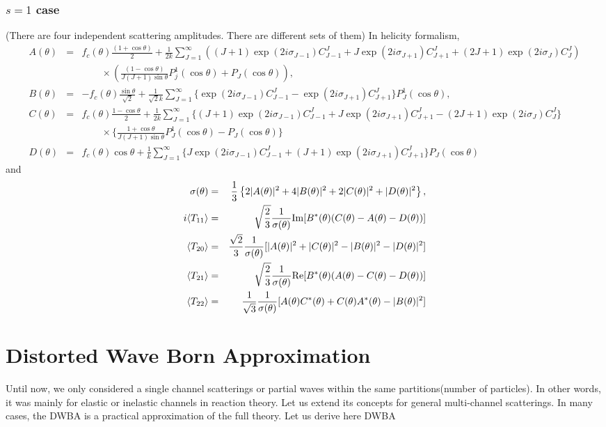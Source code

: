 \documentclass[10pt]{book}
\newcommand{\bea}{\begin{eqnarray}}
\newcommand{\eea}{\end{eqnarray}}
\newcommand{\no}{\nonumber \\}
\def\la{\langle}
\def\ra{\rangle}
\begin{document}
\subsection{$s=1$ case} 
(There are four independent scattering amplitudes. There are different sets of them)
In helicity formalism,
\bea 
A(\theta)&=&f_c(\theta)\frac{ (1+\cos\theta)}{2}
   +\frac{1}{2k}\sum_{J=1}^\infty \left( 
   (J+1) \exp(2i\sigma_{J-1})C_{J-1}^J + J\exp(2i\sigma_{J+1})C_{J+1}^J
   +(2J+1) \exp(2i\sigma_{J})C_{J}^J\right) 
   \no & &\quad \quad \times 
   \left( \frac{(1-\cos\theta)}{J(J+1)\sin\theta } P_j^1(\cos\theta)
   +P_J(\cos\theta)
   \right) ,\no 
B(\theta)&=& -f_c(\theta)\frac{\sin\theta}{\sqrt{2}}+\frac{1}{\sqrt{2}k} \sum_{J=1}^\infty 
    \Big\{ \exp(2i\sigma_{J-1})C^J_{J-1}-    \exp(2i\sigma_{J+1})C^J_{J+1}\Big\} P_J^1(\cos\theta),
    \no 
C(\theta)&=& f_c(\theta)\frac{1-\cos\theta}{2}+\frac{1}{2k}\sum_{J=1}^\infty 
    \Big\{ (J+1)\exp(2i\sigma_{J-1})C^J_{J-1}+    J\exp(2i\sigma_{J+1})C^J_{J+1}
      -(2J+1)\exp(2i\sigma_J)C_J^J\Big\}\no 
      & &\quad \quad \times 
    \Big\{ \frac{1+\cos\theta}{J(J+1)\sin\theta}P_J^1(\cos\theta) -P_J(\cos\theta)  \Big\} 
    \no 
D(\theta) &=& f_c(\theta)\cos\theta +\frac{1}{k}\sum_{J=1}^\infty 
    \Big\{ J\exp(2i\sigma_{J-1}) C_{J-1}^J+(J+1)\exp(2i\sigma_{J+1})C_{J+1}^J\Big\}
    P_J(\cos\theta)       
\eea 
and
\bea 
\sigma(\theta)&=&\frac{1}{3}\left\{2|A(\theta)|^2 +4 |B(\theta)|^2 
         +2 |C(\theta)|^2 +|D(\theta)|^2 \right\},\no 
i\la T_{11}\ra &=& \sqrt{\frac{2}{3}} \frac{1}{\sigma(\theta)}
           {\rm Im} [B^*(\theta)(C(\theta)-A(\theta)-D(\theta))] \no 
\la T_{20}\ra &=& \frac{\sqrt{2}}{3}\frac{1}{\sigma(\theta)}
     [|A(\theta)|^2 +|C(\theta)|^2 -|B(\theta)|^2-|D(\theta)|^2]\no            
\la T_{21}\ra &=&  \sqrt{\frac{2}{3}} \frac{1}{\sigma(\theta)}  
           {\rm Re} [B^*(\theta)(A(\theta)-C(\theta)-D(\theta))] \no 
\la T_{22}\ra &=& \frac{1}{\sqrt{3}}\frac{1}{\sigma(\theta)}  
         [A(\theta)C^*(\theta)+C(\theta)A^*(\theta)-|B(\theta)|^2]              
\eea 


\chapter{Distorted Wave Born Approximation}

Until now, we only considered a single channel scatterings or
partial waves within the same partitions(number of particles).
In other words, it was mainly for elastic or inelastic channels
in reaction theory. Let us extend its concepts for general 
multi-channel scatterings. In many cases, the DWBA is a practical
approximation of the full theory.
Let us derive here DWBA
\end{document}
